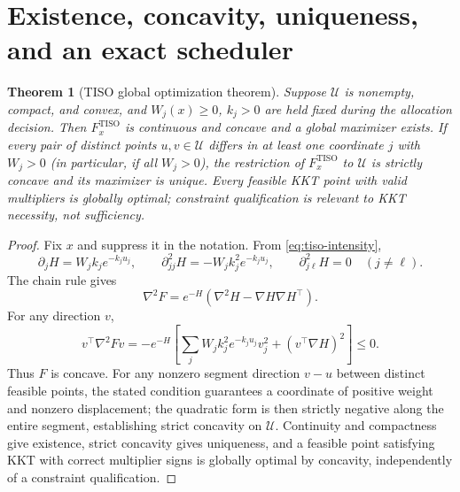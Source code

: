 \documentclass[11pt]{article}
\newtheorem{theorem}[definition]{Theorem}
\newcommand{\Uset}{\mathcal U}
\begin{document}
\section{Existence, concavity, uniqueness, and an exact scheduler}\label{sec:tiso-proofs}
\begin{theorem}[TISO global optimization theorem]\label{thm:tiso-concavity}
Suppose $\Uset$ is nonempty, compact, and convex, and $W_j(x)\ge0$, $k_j>0$ are held fixed during the allocation decision. Then $F_x^{\mathrm{TISO}}$ is continuous and concave and a global maximizer exists. If every pair of distinct points $u,v\in\Uset$ differs in at least one coordinate $j$ with $W_j>0$ (in particular, if all $W_j>0$), the restriction of $F_x^{\mathrm{TISO}}$ to $\Uset$ is strictly concave and its maximizer is unique. Every feasible KKT point with valid multipliers is globally optimal; constraint qualification is relevant to KKT necessity, not sufficiency.
\end{theorem}
\begin{proof}
Fix $x$ and suppress it in the notation. From \eqref{eq:tiso-intensity},
\[
\partial_jH=W_jk_je^{-k_ju_j},\qquad
\partial_{jj}^2H=-W_jk_j^2e^{-k_ju_j},\qquad
\partial_{j\ell}^2H=0\quad(j\ne\ell).
\]
The chain rule gives
\[
\nabla^2F=e^{-H}\left(\nabla^2H-\nabla H\nabla H^\top\right).
\]
For any direction $v$,
\[
v^\top\nabla^2Fv
=-e^{-H}\left[\sum_j W_jk_j^2e^{-k_ju_j}v_j^2+(v^\top\nabla H)^2\right]\le0.
\]
Thus $F$ is concave. For any nonzero segment direction $v-u$ between distinct feasible points, the stated condition guarantees a coordinate of positive weight and nonzero displacement; the quadratic form is then strictly negative along the entire segment, establishing strict concavity on $\Uset$. Continuity and compactness give existence, strict concavity gives uniqueness, and a feasible point satisfying KKT with correct multiplier signs is globally optimal by concavity, independently of a constraint qualification.
\end{proof}
\end{document}
